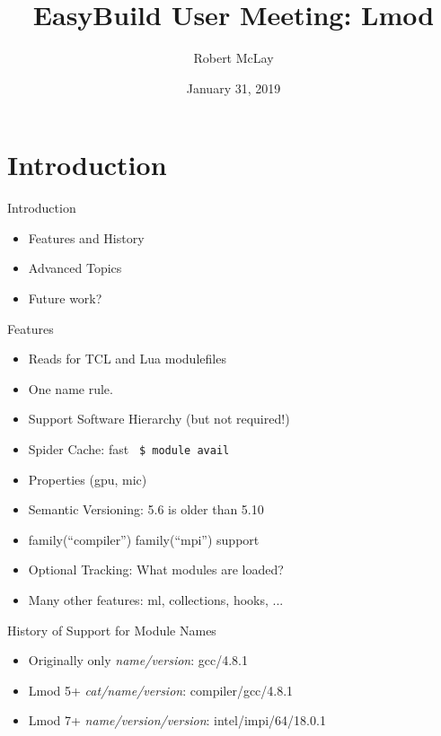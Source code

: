 \documentclass{beamer}
\begin{document}
\title[Lmod]{EasyBuild User Meeting: Lmod}
\author{Robert McLay} 
\date{January 31, 2019} 

\frame{\titlepage} 

\section{Introduction}

\begin{frame}{Introduction}
  \begin{itemize}
    \item Features and History
    \item Advanced Topics
    \item Future work?
  \end{itemize}
\end{frame}

\begin{frame}{Features}
  \begin{itemize}
    \item Reads for TCL and Lua modulefiles
    \item One name rule.
    \item Support Software Hierarchy (but not required!)
    \item Spider Cache: fast \texttt{\color{blue} \$ module avail}
    \item Properties (gpu, mic)
    \item Semantic Versioning:  5.6 is older than 5.10
    \item family(``compiler'') family(``mpi'') support
    \item Optional Tracking: What modules are loaded?
    \item Many other features: ml, collections, hooks, ...
  \end{itemize}
\end{frame}

\begin{frame}{History of Support for Module Names}
  \begin{itemize}
    \item Originally only \emph{name/version}:  gcc/4.8.1
    \item Lmod 5+ \emph{cat/name/version}:  compiler/gcc/4.8.1
    \item Lmod 7+ \emph{name/version/version}: intel/impi/64/18.0.1
  \end{itemize}
\end{frame}
\end{document}
